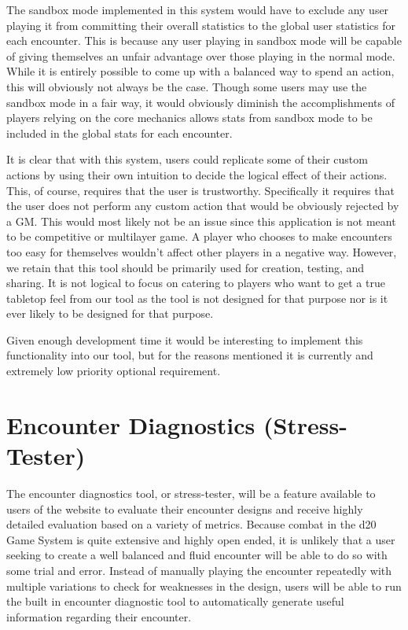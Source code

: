 \documentclass[12pt,a4paper]{report}
\begin{document}
		The sandbox mode implemented in this system would have to exclude any user playing it from committing their overall statistics to the global user statistics for each encounter. This is because any user playing in sandbox mode will be capable of giving themselves an unfair advantage over those playing in the normal mode. While it is entirely possible to come up with a balanced way to spend an action, this will obviously not always be the case. Though some users may use the sandbox mode in a fair way, it would obviously diminish the accomplishments of players relying on the core mechanics allows stats from sandbox mode to be included in the global stats for each encounter.  
		
		It is clear that with this system, users could replicate some of their custom actions by using their own intuition to decide the logical effect of their actions. This, of course, requires that the user is trustworthy. Specifically it requires that the user does not perform any custom action that would be obviously rejected by a GM. This would most likely not be an issue since this application is not meant to be competitive or multilayer game. A player who chooses to make encounters too easy for themselves wouldn't affect other players in a negative way. However, we retain that this tool should be primarily used for creation, testing, and sharing. It is not logical to focus on catering to players who want to get a true tabletop feel from our tool as the tool is not designed for that purpose nor is it ever likely to be designed for that purpose. 
		
		Given enough development time it would be interesting to implement this functionality into our tool, but for the reasons mentioned it is currently and extremely low priority optional requirement. 
		
	\newpage
	\section{Encounter Diagnostics (Stress-Tester)}
	The encounter diagnostics tool, or stress-tester, will be a feature available to users of the website to evaluate their encounter designs and receive highly detailed evaluation based on a variety of metrics. Because combat in the d20 Game System is quite extensive and highly open ended, it is unlikely that a user seeking to create a well balanced and fluid encounter will be able to do so with some trial and error. Instead of manually playing the encounter repeatedly with multiple variations to check for weaknesses in the design, users will be able to run the built in encounter diagnostic tool to automatically generate useful information regarding their encounter. 
	
\end{document}
